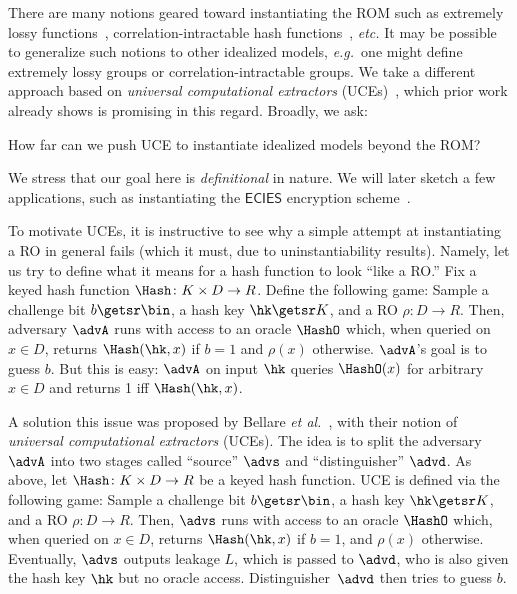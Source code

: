 {\begin{itemize}
There are many notions geared toward instantiating the ROM  such as extremely lossy functions~\cite{C:Zhandry16}, correlation-intractable hash functions~\cite{JACM:CanGolHal04}, \emph{etc.} It may be possible to generalize such notions  to other idealized models, \emph{e.g.}~one might  define extremely lossy groups or correlation-intractable groups. We take a different approach based on \emph{universal computational extractors} (UCEs)~\cite{C:BelHoaKee13}, which prior work already shows is promising in this regard. Broadly, we ask:
\begin{ques}
 How far can we push UCE  to instantiate idealized models beyond the ROM?
\end{ques}

We stress that our goal here is \emph{definitional} in nature. We will later sketch a few applications, such as instantiating the $\mathsf{ECIES}$ encryption scheme~\cite{}.

To motivate  UCEs, it is instructive to see why a simple attempt at instantiating a RO in general fails (which it must, due to uninstantiability results). Namely, let us  try to define what it means for a hash function to look ``like a RO.''  Fix a keyed hash function $\Hash \colon K \times D \to R$. Define  the following game: Sample a challenge bit $b \getsr \bin$, a hash key $\hk\getsr K$, and a RO $\rho \colon D \to R$.  Then, adversary $\advA$  runs with access to an oracle $\HashO$ which, when queried on $x \in D$, returns $\Hash(\hk,x)$ if $b =1$ and $\rho(x)$ otherwise. $\advA$'s goal is to guess $b$.  But this is easy: $\advA$ on input $\hk$ queries $\HashO(x)$ for arbitrary $x \in D$ and returns 1 iff $\Hash(\hk,x)$. 

A solution this issue was proposed by Bellare \emph{et al.}~\cite{C:BelHoaKee13,C:BelHoaKee14},  with  their  notion of \emph{universal computational extractors} (UCEs). 
 The idea  is to split the adversary $\advA$ into two stages called ``source'' $\advs$ and ``distinguisher'' $\advd$.
 As above, let $\Hash \colon K \times D \to R$ be a keyed hash function. UCE is defined via the following game: Sample a challenge bit $b \getsr \bin$, a hash key $\hk \getsr K$, and a RO $\rho \colon D \to R$. Then, $\advs$ runs with access to an oracle $\HashO$ which, when queried on $x \in D$, returns $\Hash(\hk, x)$ if $b = 1$, and $\rho(x)$ otherwise. Eventually, $\advs$ outputs leakage $L$, which is passed to $\advd$, who is also given the hash key $\hk$ but no oracle access. Distinguisher~$\advd$ then tries to guess $b$. 
 

\end{itemize}}
